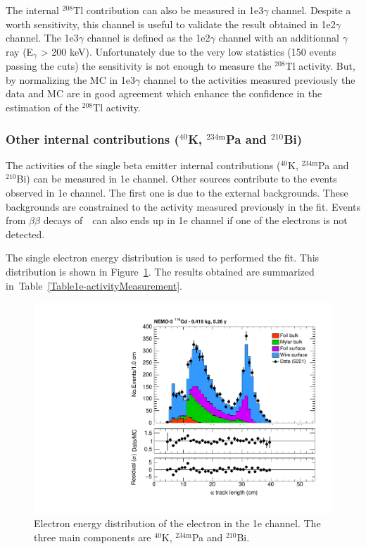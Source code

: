 \documentclass[main.tex]{subfiles}
\begin{document}
\bigskip


\NI The internal $^{\text{208}}$Tl contribution can also be measured in 1e3$\gamma$ channel. Despite a worth sensitivity, this channel is useful to validate the result obtained in 1e2$\gamma$ channel. The 1e3$\gamma$ channel is defined as the  1e2$\gamma$ channel with an additionnal $\gamma$ ray (E$_{\gamma}$ > 200 keV). Unfortunately due to the very low statistics (150 events passing the cuts) the sensitivity is not enough to measure the $^{\text{208}}$Tl activity. But, by normalizing the MC in 1e3$\gamma$ channel to the activities measured previously the data and MC are in good agreement which enhance the confidence in the estimation of the $^{\text{208}}$Tl activity. 


\FloatBarrier


\subsubsection{Other internal contributions ($^{\text{40}}$K, $^{\text{234m}}$Pa and $^{\text{210}}$Bi)}\label{sec:1echannel}


\NI The activities of the single beta emitter internal contributions ($^{\text{40}}$K, $^{\text{234m}}$Pa and $^{\text{210}}$Bi) can be measured in 1e channel. Other sources contribute to the events observed in 1e channel. The first one is due to the external backgrounds. These backgrounds are constrained to the activity measured previously in the fit. Events from $\beta\beta$ decays of~\Cd~can also ends up in 1e channel if one of the electrons is not detected. 


\bigskip


\NI The single electron energy distribution is used to performed the fit. This distribution is shown in Figure~\ref{1eChannel_Ee}. The results obtained are summarized in~Table~\ref{Table1e-activityMeasurement}. 


\begin{figure}[h!]
\centering
\includegraphics[page=4,scale=0.55]{pictures/Chap6/FinalPlots.pdf}
\caption{Electron energy distribution of the electron in the 1e channel. The three main components are $^{\text{40}}$K, $^{\text{234m}}$Pa and $^{\text{210}}$Bi.}
\label{1eChannel_Ee}
\end{figure}
\end{document}
